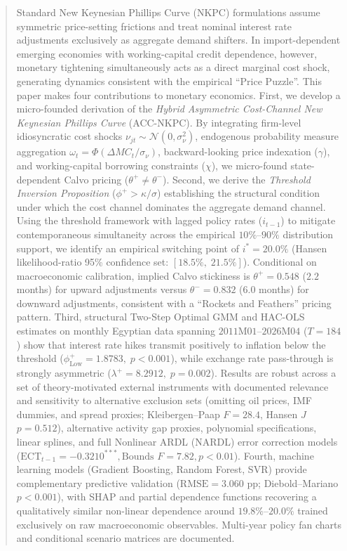 \documentclass[review,12pt]{elsarticle}
\begin{document}
\begin{frontmatter}
\begin{abstract}
Standard New Keynesian Phillips Curve (NKPC) formulations assume symmetric
price-setting frictions and treat nominal interest rate adjustments exclusively
as aggregate demand shifters. In import-dependent emerging economies with
working-capital credit dependence, however, monetary tightening simultaneously
acts as a direct marginal cost shock, generating dynamics consistent with the empirical
``Price Puzzle''. This paper makes four contributions to monetary economics.
First, we develop a micro-founded derivation of the \textit{Hybrid Asymmetric Cost-Channel
New Keynesian Phillips Curve} (ACC-NKPC). By integrating firm-level idiosyncratic cost
shocks $\nu_{jt} \sim \mathcal{N}(0,\sigma_\nu^2)$, endogenous probability measure aggregation
$\omega_t = \Phi(\Delta MC_t / \sigma_\nu)$, backward-looking price indexation ($\gamma$),
and working-capital borrowing constraints ($\chi$), we micro-found state-dependent
Calvo pricing ($\theta^+ \neq \theta^-$). Second, we derive the \textit{Threshold Inversion
Proposition} ($\phi^+ > \kappa/\sigma$) establishing the structural condition under which the
cost channel dominates the aggregate demand channel. Using the \citet{hansen2000} threshold
framework with lagged policy rates ($i_{t-1}$) to mitigate contemporaneous simultaneity across
the empirical $10\%$--$90\%$ distribution support, we identify an empirical switching point of
$i^* = 20.0\%$ (Hansen likelihood-ratio 95\% confidence set: $[18.5\%,\;21.5\%]$). Conditional
on macroeconomic calibration, implied Calvo stickiness is $\theta^+ = 0.548$ ($2.2$ months)
for upward adjustments versus $\theta^- = 0.832$ ($6.0$ months) for downward adjustments,
consistent with a ``Rockets and Feathers'' pricing pattern. Third, structural Two-Step Optimal
GMM and HAC-OLS estimates on monthly Egyptian data spanning $2011\text{M}01$--$2026\text{M}04$ ($T=184$)
show that interest rate hikes transmit positively to inflation below the threshold
($\phi_{\text{Low}}^{+} = 1.8783,\; p < 0.001$), while exchange rate pass-through is strongly
asymmetric ($\lambda^{+} = 8.2912,\; p = 0.002$). Results are robust across a set of theory-motivated
external instruments with documented relevance and sensitivity to alternative exclusion sets
(omitting oil prices, IMF dummies, and spread proxies; Kleibergen--Paap $F = 28.4$,
Hansen $J$ $p = 0.512$), alternative \citet{hamilton2018} activity gap proxies, polynomial
specifications, linear splines, and full Nonlinear ARDL (NARDL) error correction models
($\text{ECT}_{t-1} = -0.3210^{***}, \text{Bounds } F = 7.82, p < 0.01$). Fourth, machine learning
models (Gradient Boosting, Random Forest, SVR) provide complementary predictive validation
($\text{RMSE}=3.060\text{ pp}$; Diebold--Mariano $p < 0.001$), with SHAP and partial dependence
functions recovering a qualitatively similar non-linear dependence around $19.8\%$--$20.0\%$
trained exclusively on raw macroeconomic observables. Multi-year policy fan charts and conditional
scenario matrices are documented.
\end{abstract}


\end{frontmatter}
\end{document}
